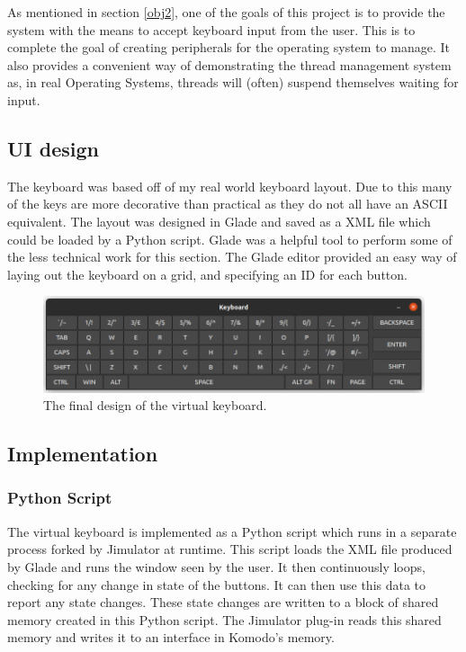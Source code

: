 \label{chap:virtualKeyboard}
As mentioned in section \ref{obj2}, one of the goals of this project is to provide the system with the means to accept keyboard input from the user. This is to complete the goal of creating peripherals for the operating system to manage. It also provides a convenient way of demonstrating the thread management system as, in real Operating Systems, threads will (often) suspend themselves waiting for input.
\subsection{UI design}
The keyboard was based off of my real world keyboard layout. Due to this many of the keys are more decorative than practical as they do not all have an ASCII \cite{ascii} equivalent. The layout was designed in Glade \cite{glade} and saved as a XML file which could be loaded by a Python script. Glade was a helpful tool to perform some of the less technical work for this section. The Glade editor provided an easy way of laying out the keyboard on a grid, and specifying an ID for each button. 


\begin{figure}[ht!]
	\includegraphics[width=\linewidth]{figures/keyboard.png}
	\caption{The final design of the virtual keyboard.}
	\label{fig:keyboard}
\end{figure} 




\subsection{Implementation}
\subsubsection{Python Script}
The virtual keyboard is implemented as a Python \cite{python} script which runs in a separate process forked by Jimulator at runtime. This script loads the XML file produced by Glade and runs the window seen by the user. It then continuously loops, checking for any change in state of the buttons. It can then use this data to report any state changes.  These state changes are written to a block of shared memory created in this Python script. The Jimulator plug-in reads this shared memory and writes it to an interface in Komodo's memory.
